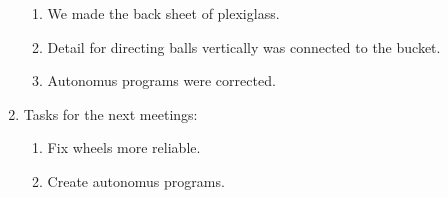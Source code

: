\begin{enumerate}
\begin{enumerate}
        \item We made the back sheet of plexiglass.
        
        \item Detail for directing balls vertically was connected to the bucket.
        
        \item Autonomus programs were corrected.
        
	\end{enumerate}
	
	\item Tasks for the next meetings:
	\begin{enumerate}
		
		\item Fix wheels more reliable.
		
		\item Create autonomus programs.
			
	\end{enumerate}
\end{enumerate}
\fillpage
